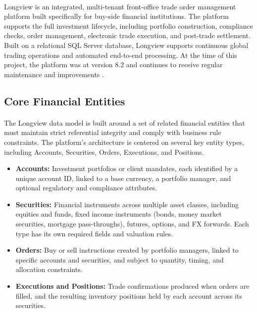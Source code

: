 \paragraph{}Longview is an integrated, multi-tenant front-office trade order management platform built specifically for buy-side financial institutions. The platform supports the full investment lifecycle, including portfolio construction, compliance checks, order management, electronic trade execution, and post-trade settlement. Built on a relational SQL Server database, Longview supports continuous global trading operations and automated end-to-end processing. At the time of this project, the platform was at version 8.2 and continues to receive regular maintenance and improvements \cite{longview_oms}.

\subsection{Core Financial Entities}

\paragraph{}The Longview data model is built around a set of related financial entities that must maintain strict referential integrity and comply with business rule constraints. The platform's architecture is centered on several key entity types, including Accounts, Securities, Orders, Executions, and Positions.

\begin{itemize}
\item \textbf{Accounts:} Investment portfolios or client mandates, each identified by a unique account ID, linked to a base currency, a portfolio manager, and optional regulatory and compliance attributes.
\item \textbf{Securities:} Financial instruments across multiple asset classes, including equities and funds, fixed income instruments (bonds, money market securities, mortgage pass-throughs), futures, options, and FX forwards. Each type has its own required fields and valuation rules.
\item \textbf{Orders:} Buy or sell instructions created by portfolio managers, linked to specific accounts and securities, and subject to quantity, timing, and allocation constraints.
\item \textbf{Executions and Positions:} Trade confirmations produced when orders are filled, and the resulting inventory positions held by each account across its securities.
\end{itemize}

